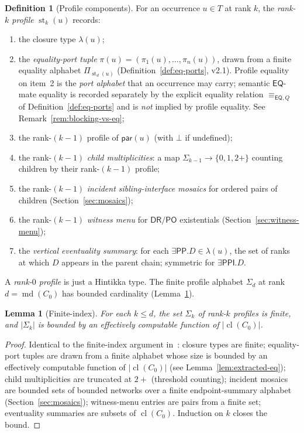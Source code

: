 \documentclass[11pt]{article}
\newtheorem{lemma}[theorem]{Lemma}
\theoremstyle{definition}
\newtheorem{definition}[theorem]{Definition}
\theoremstyle{remark}
\newcommand{\DR}{\mathsf{DR}}
\newcommand{\PO}{\mathsf{PO}}
\newcommand{\PP}{\mathsf{PP}}
\newcommand{\PPI}{\mathsf{PPI}}
\newcommand{\EQ}{\mathsf{EQ}}
\newcommand{\cl}{\operatorname{cl}}
\newcommand{\md}{\operatorname{md}}
\newcommand{\st}{\operatorname{st}}
\newcommand{\eqQ}{\equiv_{\EQ,Q}}
\begin{document}
\begin{definition}[Profile components]\label{def:profile-components}
For an occurrence $u \in T$ at rank $k$, the \emph{rank-$k$
profile} $\st_k(u)$ records:
\begin{enumerate}
\item the closure type $\lambda(u)$;
\item the \emph{equality-port tuple} $\pi(u) =
  (\pi_1(u),\ldots,\pi_n(u))$, drawn from a finite equality alphabet
  $\Pi_{\st_d(u)}$ (Definition~\ref{def:eq-ports}, v2.1).  Profile
  equality on item~2 is the \emph{port alphabet} that an occurrence
  may carry; semantic $\EQ$-mate equality is recorded separately
  by the explicit equality relation $\eqQ$ of
  Definition~\ref{def:eq-ports} and is \emph{not} implied by profile
  equality.  See Remark~\ref{rem:blocking-vs-eq};
\item the rank-$(k-1)$ profile of $\mathsf{par}(u)$ (with $\bot$ if
  undefined);
\item the rank-$(k-1)$ \emph{child multiplicities}: a map
  $\Sigma_{k-1} \to \{0,1,2{+}\}$ counting children by their rank-$(k-1)$
  profile;
\item the rank-$(k-1)$ \emph{incident sibling-interface mosaics}
  for ordered pairs of children
  (Section~\ref{sec:mosaics});
\item the rank-$(k-1)$ \emph{witness menu} for $\DR/\PO$
  existentials (Section~\ref{sec:witness-menu});
\item the \emph{vertical eventuality summary}: for each
  $\exists\PP.D \in \lambda(u)$, the set of ranks at which $D$
  appears in the parent chain; symmetric for $\exists\PPI.D$.
\end{enumerate}
A \emph{rank-$0$ profile} is just a Hintikka type.  The finite
profile alphabet $\Sigma_d$ at rank $d = \md(C_0)$ has bounded
cardinality (Lemma~\ref{lem:finite-index}).
\end{definition}

\begin{lemma}[Finite-index]\label{lem:finite-index}
For each $k \le d$, the set $\Sigma_k$ of rank-$k$ profiles is
finite, and $|\Sigma_k|$ is bounded by an effectively computable
function of $|\cl(C_0)|$.
\end{lemma}

\begin{proof}
Identical to the finite-index argument
in~\cite[Lemma~7.4]{GPT55Generated}: closure types are finite;
equality-port tuples are drawn from a finite alphabet whose size is
bounded by an effectively computable function of $|\cl(C_0)|$
(see Lemma~\ref{lem:extracted-eq}); child multiplicities are
truncated at $2{+}$ (threshold counting); incident mosaics are
bounded sets of bounded networks over a finite endpoint-summary
alphabet (Section~\ref{sec:mosaics}); witness-menu entries are pairs
from a finite set; eventuality summaries are subsets of $\cl(C_0)$.
Induction on $k$ closes the bound.
\end{proof}
\end{document}
